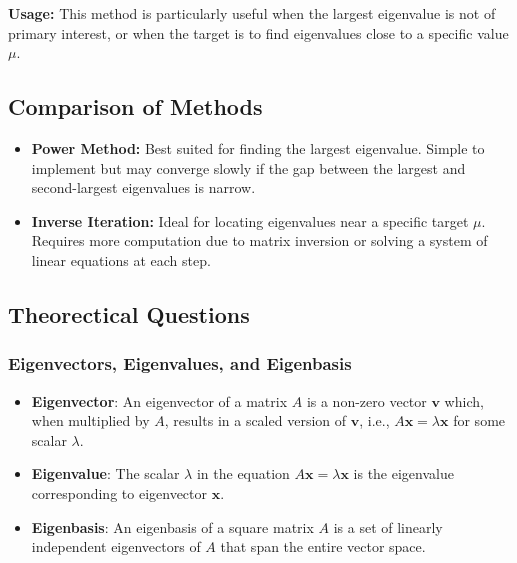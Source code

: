 \documentclass[unicode,11pt,a4paper,oneside,numbers=endperiod,openany]{scrartcl}
\begin{document}
\textbf{Usage:} This method is particularly useful when the largest eigenvalue is not of primary interest, or when the target is to find eigenvalues close to a specific value \( \mu \).

\subsection{Comparison of Methods}

\begin{itemize}
    \item \textbf{Power Method:} Best suited for finding the largest eigenvalue. Simple to implement but may converge slowly if the gap between the largest and second-largest eigenvalues is narrow.
    \item \textbf{Inverse Iteration:} Ideal for locating eigenvalues near a specific target \( \mu \). Requires more computation due to matrix inversion or solving a system of linear equations at each step.
\end{itemize}



\subsection{Theorectical Questions}

\subsubsection{Eigenvectors, Eigenvalues, and Eigenbasis}
\begin{itemize}
    \item \textbf{Eigenvector}: An eigenvector of a matrix \( A \) is a non-zero vector \( \mathbf{v} \) which, when multiplied by \( A \), results in a scaled version of \( \mathbf{v} \), i.e., \( A\mathbf{x} = \lambda\mathbf{x} \) for some scalar \( \lambda \).
    \item \textbf{Eigenvalue}: The scalar \( \lambda \) in the equation \( A\mathbf{x} = \lambda\mathbf{x} \) is the eigenvalue corresponding to eigenvector \( \mathbf{x} \).
    \item \textbf{Eigenbasis}: An eigenbasis of a square matrix \( A \) is a set of linearly independent eigenvectors of \( A \) that span the entire vector space.
\end{itemize}
\end{document}
